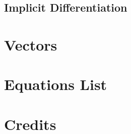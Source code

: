 \documentclass{article}
\begin{document}
\subsection{Implicit Differentiation}



\section{Vectors}


\pagebreak
\appendix
\section*{Equations List}
%


\pagebreak
\printindex

\pagebreak
\section*{Credits}
%
\end{document}
